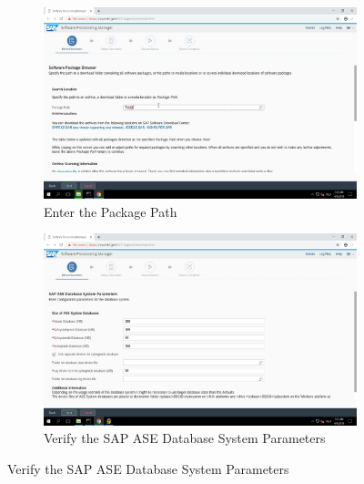 \begin{figure}[!htb]\ContinuedFloat
    \begin{subfigure}{0.5\textwidth}
        \captionsetup{width=0.8\linewidth}
        \includegraphics[width=0.9\linewidth]{img/Methodologie/SAP26.png}
        \centering
        \caption{Enter the Package Path}
    \end{subfigure}
    \begin{subfigure}{0.5\textwidth}
    \captionsetup{width=0.8\linewidth}
    \includegraphics[width=0.9\linewidth]{img/Methodologie/SAP23.png} 
    \centering
    \caption{Verify the SAP ASE Database System Parameters}
    \end{subfigure}
\end{figure}
